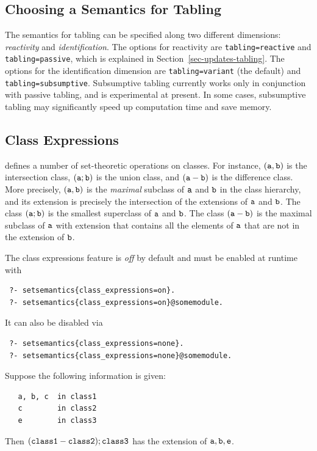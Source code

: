 \documentclass[11pt]{article}
\newcommand{\ERGO}{\mbox{\smaller{\ensuremath{\cal{E}}\smaller{{\sc{RGO}}}}}\xspace}
\newcommand{\FLSYSTEM}{\ERGO}
\begin{document}
\subsection{Choosing a Semantics for Tabling}

The semantics for tabling can be specified along two different dimensions:
\emph{reactivity} and \emph{identification}.
The options for reactivity are \texttt{tabling=reactive} and
\texttt{tabling=passive}, which is explained in
Section~\ref{sec-updates-tabling}.
The options for the identification dimension are
\texttt{tabling=variant} (the default) and \texttt{tabling=subsumptive}.
Subsumptive tabling currently works only in conjunction with passive tabling,
and is experimental at present.  In some cases, subsumptive tabling may
significantly speed up computation time and save memory.


\subsection{Class Expressions}
\label{sec-class-expr}

\FLSYSTEM defines a number of set-theoretic
operations on classes. For instance, $\tt (a,b)$ is the
intersection class, $\tt (a;b)$ is the union class, and $\tt (a-b)$ is
the difference class. More precisely, $\tt (a,b)$ is the \emph{maximal}
subclass of $\tt a$ and $\tt b$ in the class hierarchy, and its extension is
precisely the intersection of the extensions of $\tt a$ and $\tt b$. The class
$\tt (a;b)$ is the smallest superclass of $\tt a$ and $\tt b$. The class $\tt (a-b)$ is the
maximal subclass of $\tt a$ with extension that contains all the elements of
$\tt a$ that are not in the extension of $\tt b$.

The class expressions feature is \emph{off} by default and must be enabled
at runtime with
\begin{verbatim}
 ?- setsemantics{class_expressions=on}.
 ?- setsemantics{class_expressions=on}@somemodule.
\end{verbatim}
It can also be disabled via
\begin{verbatim}
 ?- setsemantics{class_expressions=none}.
 ?- setsemantics{class_expressions=none}@somemodule.
\end{verbatim}

Suppose the following information is given:
\begin{verbatim}
   a, b, c  in class1
   c        in class2
   e        in class3
\end{verbatim}
Then $\tt (class1 - class2) ; class3$ has the extension of $\tt a,b,e$.
\end{document}
